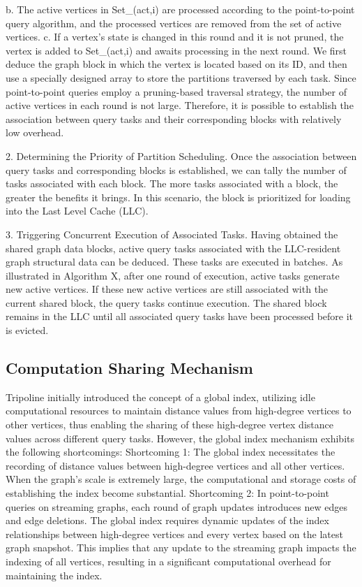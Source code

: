 \documentclass[lettersize,journal]{IEEEtran} %
\begin{document}
b. The active vertices in Set_(act,i) are processed according to the point-to-point query algorithm, and the processed vertices are removed from the set of active vertices.
c. If a vertex's state is changed in this round and it is not pruned, the vertex is added to Set_(act,i) and awaits processing in the next round.
We first deduce the graph block in which the vertex is located based on its ID, and then use a specially designed array to store the partitions traversed by each task. Since point-to-point queries employ a pruning-based traversal strategy, the number of active vertices in each round is not large. Therefore, it is possible to establish the association between query tasks and their corresponding blocks with relatively low overhead.

2. Determining the Priority of Partition Scheduling. Once the association between query tasks and corresponding blocks is established, we can tally the number of tasks associated with each block. The more tasks associated with a block, the greater the benefits it brings. In this scenario, the block is prioritized for loading into the Last Level Cache (LLC).

3. Triggering Concurrent Execution of Associated Tasks. Having obtained the shared graph data blocks, active query tasks associated with the LLC-resident graph structural data can be deduced. These tasks are executed in batches. As illustrated in Algorithm X, after one round of execution, active tasks generate new active vertices. If these new active vertices are still associated with the current shared block, the query tasks continue execution. The shared block remains in the LLC until all associated query tasks have been processed before it is evicted.

\subsection{Computation Sharing Mechanism}
Tripoline initially introduced the concept of a global index, utilizing idle computational resources to maintain distance values from high-degree vertices to other vertices, thus enabling the sharing of these high-degree vertex distance values across different query tasks. However, the global index mechanism exhibits the following shortcomings:  Shortcoming 1: The global index necessitates the recording of distance values between high-degree vertices and all other vertices. When the graph's scale is extremely large, the computational and storage costs of establishing the index become substantial. Shortcoming 2: In point-to-point queries on streaming graphs, each round of graph updates introduces new edges and edge deletions. The global index requires dynamic updates of the index relationships between high-degree vertices and every vertex based on the latest graph snapshot. This implies that any update to the streaming graph impacts the indexing of all vertices, resulting in a significant computational overhead for maintaining the index.
\end{document}
